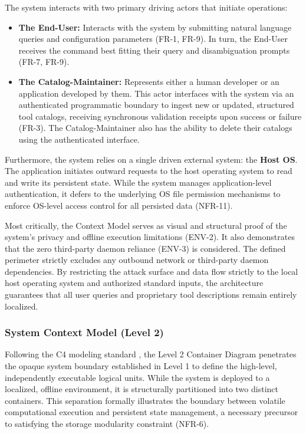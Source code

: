 The system interacts with two primary driving actors that initiate operations:
\begin{itemize}
    \item \textbf{The End-User:} Interacts with the system by submitting natural language queries and configuration parameters (FR-1, FR-9). In turn, the End-User receives the command best fitting their query and disambiguation prompts (FR-7, FR-9).
    \item \textbf{The Catalog-Maintainer:} Represents either a human developer or an application developed by them. This actor interfaces with the system via an authenticated programmatic boundary to ingest new or updated, structured tool catalogs, receiving synchronous validation receipts upon success or failure (FR-3). The Catalog-Maintainer also has the ability to delete their catalogs using the authenticated interface.
\end{itemize}
\FloatBarrier

Furthermore, the system relies on a single driven external system: the \textbf{Host \ac{OS}}. The application initiates outward requests to the host operating system to read and write its persistent state. While the system manages application-level authentication, it defers to the underlying \ac{OS} file permission mechanisms to enforce \ac{OS}-level access control for all persisted data (NFR-11). 

Most critically, the Context Model serves as visual and structural proof of the system's privacy and offline execution limitations (ENV-2). It also demonstrates that the zero third-party daemon reliance (ENV-3) is considered. The defined perimeter strictly excludes any outbound network or third-party daemon dependencies. By restricting the attack surface and data flow strictly to the local host operating system and authorized standard inputs, the architecture guarantees that all user queries and proprietary tool descriptions remain entirely localized.

\subsubsection{System Context Model (Level 2)}
\label{sec:container_architecture}

Following the C4 modeling standard \cite{brown2026c4}, the Level 2 Container Diagram penetrates the opaque system boundary established in Level 1 to define the high-level, independently executable logical units. While the system is deployed to a localized, offline environment, it is structurally partitioned into two distinct containers. This separation formally illustrates the boundary between volatile computational execution and persistent state management, a necessary precursor to satisfying the storage modularity constraint (NFR-6).

